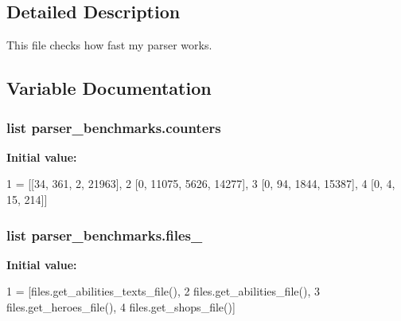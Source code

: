 \subsection{Detailed Description}
\begin{DoxyVerb}This file checks how fast my parser works.\end{DoxyVerb}
 

\subsection{Variable Documentation}
\subsubsection[{\texorpdfstring{counters}{counters}}]{\setlength{\rightskip}{0pt plus 5cm}list parser\+\_\+benchmarks.\+counters}\hypertarget{namespaceparser__benchmarks_ac0b88e48637c27772d1f5d393f52c7d1}{}\label{namespaceparser__benchmarks_ac0b88e48637c27772d1f5d393f52c7d1}
{\bfseries Initial value\+:}
\begin{DoxyCode}
1 = [[34, 361, 2, 21963],
2                 [0, 11075, 5626, 14277],
3                 [0, 94, 1844, 15387],
4                 [0, 4, 15, 214]]
\end{DoxyCode}
\subsubsection[{\texorpdfstring{files\+\_\+}{files\_}}]{\setlength{\rightskip}{0pt plus 5cm}list parser\+\_\+benchmarks.\+files\+\_\+}\hypertarget{namespaceparser__benchmarks_a5c3e20b3e7c2dad9f3258ac8b19a0e70}{}\label{namespaceparser__benchmarks_a5c3e20b3e7c2dad9f3258ac8b19a0e70}
{\bfseries Initial value\+:}
\begin{DoxyCode}
1 = [files.get\_abilities\_texts\_file(),
2               files.get\_abilities\_file(),
3               files.get\_heroes\_file(),
4               files.get\_shops\_file()]
\end{DoxyCode}
